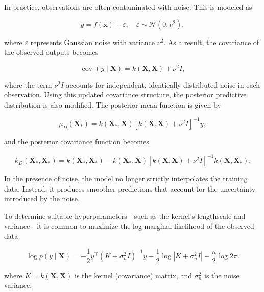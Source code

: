 \documentclass{ut-thesis}
\begin{document}
\newpage
In practice, observations are often contaminated with noise. This is modeled as

\begin{equation}
    y = f(\mathbf{x}) + \varepsilon, \quad \varepsilon \sim \mathcal{N}(0, \nu^2),
\end{equation}

where \( \varepsilon \) represents Gaussian noise with variance \( \nu^2 \). As a result, the covariance of the observed outputs becomes

\begin{equation}
    \operatorname{cov}(y \mid \mathbf{X}) = k(\mathbf{X}, \mathbf{X}) + \nu^2 I,
\end{equation}

where the term \( \nu^2 I \) accounts for independent, identically distributed noise in each observation. Using this updated covariance structure, the posterior predictive distribution is also modified. The posterior mean function is given by

\begin{equation}
    \mu_D(\mathbf{X_*}) = k(\mathbf{X_*}, \mathbf{X}) \left[k(\mathbf{X}, \mathbf{X}) + \nu^2 I\right]^{-1} y,
\end{equation}

and the posterior covariance function becomes

\begin{equation}
    k_D(\mathbf{X_*}, \mathbf{X_*}) = k(\mathbf{X_*}, \mathbf{X_*}) - k(\mathbf{X_*}, \mathbf{X}) \left[k(\mathbf{X}, \mathbf{X}) + \nu^2 I\right]^{-1} k(\mathbf{X}, \mathbf{X_*}).
\end{equation}

In the presence of noise, the model no longer strictly interpolates the training data. Instead, it produces smoother predictions that account for the uncertainty introduced by the noise.

To determine suitable hyperparameters—such as the kernel's lengthscale and variance—it is common to maximize the log-marginal likelihood of the observed data

\begin{equation}
    \log p(y \mid \mathbf{X}) = -\frac{1}{2} y^{\top} (K + \sigma_n^2 I)^{-1} y - \frac{1}{2} \log \left|K + \sigma_n^2 I\right| - \frac{n}{2} \log 2\pi.
\end{equation}

\noindent
where \( K = k(\mathbf{X}, \mathbf{X}) \) is the kernel (covariance) matrix, and \( \sigma_n^2 \) is the noise variance.
\end{document}
